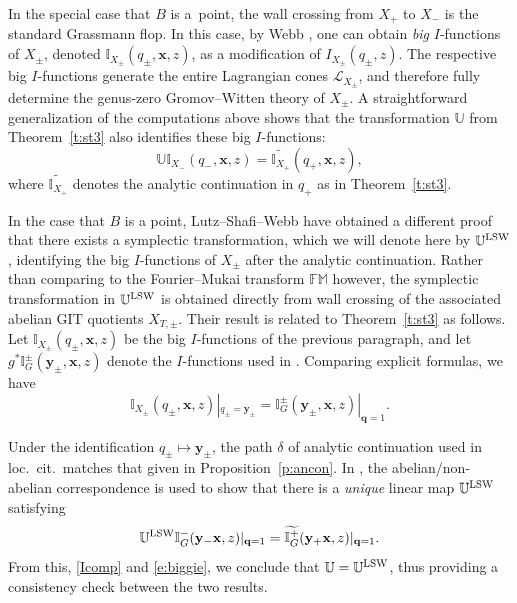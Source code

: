 \documentclass[pdftex]{sigma}
\numberwithin{equation}{section}
\newcommand{\cc}[1]{\mathcal{#1}} %
\newcommand{\UU}{\mathbb{U}}
\newcommand{\FM}{\mathbb{FM}}
\begin{document}
\begin{Remark}\label{r:bigcomp}
In the special case that $B$ is a~point, the wall crossing from $X_+$ to $X_-$ is the standard Grassmann flop.
In this case, by Webb \cite[Section~6.3]{Web}, one can obtain \emph{big} $I$-functions of $X_{\pm}$, denoted $\mathbb I_{X_{\pm}}(q_\pm, \mathbf x, z)$, as a modification of $I_{X_\pm}(q_\pm, z)$.
The respective big $I$-functions generate the entire Lagrangian cones $\cc L_{X_\pm}$, and therefore fully determine the genus-zero Gromov--Witten theory of $X_\pm$. A straightforward generalization of the computations above shows that the transformation $\UU$ from Theorem~\ref{t:st3} also identifies these big $I$-functions:
\begin{equation}\label{e:biggie} \UU \mathbb I_{X_{-}}(q_- , \mathbf x,z) =\widetilde{ \mathbb I_{X_{+}}}(q_+ , \mathbf x,z),\end{equation}
where $\widetilde{ \mathbb I_{X_{+}}}$ denotes the analytic continuation in $q_+$ as in Theorem~\ref{t:st3}.

In the case that $B$ is a point,
Lutz--Shafi--Webb \cite{LSW} have obtained a different proof that there exists a symplectic transformation, which we will denote here by $\UU^{\rm LSW}$, identifying the big $I$-functions of $X_\pm$ after the analytic continuation.
Rather than comparing to the Fourier--Mukai transform $\FM$ however, the symplectic transformation in $\UU^{\rm LSW}$ is obtained directly from wall crossing of the associated abelian GIT quotients $X_{T, \pm}$. Their result is related to Theorem~\ref{t:st3} as follows. Let $\mathbb I_{X_\pm}(q_\pm, \mathbf x ,z)$ be the big $I$-functions of the previous paragraph, and let
$g^* \mathbb I^{\pm}_G(\mathbf y_\pm, \mathbf x ,z)$ denote the $I$-functions used in \cite{LSW}. Comparing explicit formulas, we have
\begin{equation}\label{Icomp} \mathbb I_{X_\pm}(q_\pm , \mathbf x,z)|_{q_\pm = \mathbf y_\pm} = \mathbb I^{\pm}_G(\mathbf y_\pm , \mathbf x,z)|_{\mathbf q = 1}.
\end{equation}

Under the identification
$q_\pm \mapsto \mathbf y_\pm$, the path $\delta$ of analytic continuation used in loc.~cit.\ matches that given in Proposition~\ref{p:ancon}. In \cite{LSW}, the abelian/non-abelian correspondence is used to show that there is a \emph{unique} linear map $\UU^{\rm LSW}$ satisfying
\[
\UU^{\rm LSW} \mathbb I^{-}_G(\mathbf y_- \mathbf x,z)|_{\mathbf q = 1} = \widetilde{\mathbb I^{+}_G}(\mathbf y_+ \mathbf x,z)|_{\mathbf q = 1}.
\]
From this, \eqref{Icomp} and \eqref{e:biggie}, we conclude that $\UU = \UU^{\rm LSW}$, thus providing a consistency check between the two results.
\end{Remark}
\end{document}
